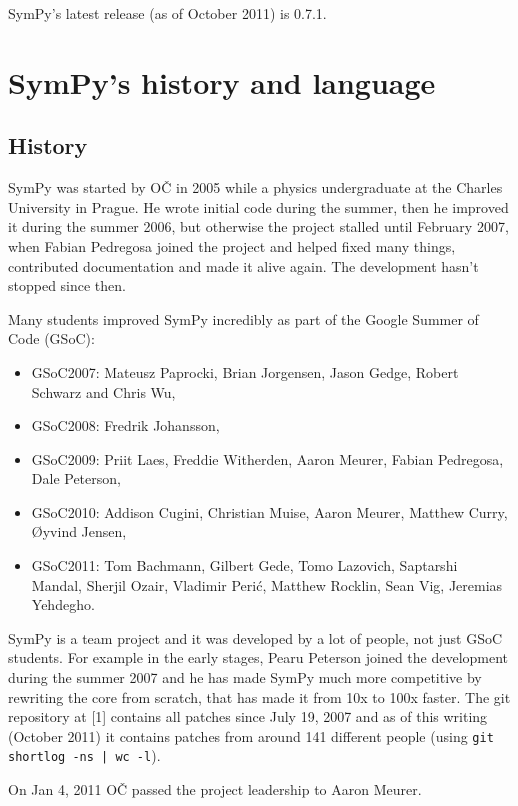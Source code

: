 \documentclass[12pt]{article}
\def\OC{OČ}
\def\AM{Aaron Meurer}
\begin{document}
SymPy's latest release (as of October 2011) is 0.7.1.

\section{SymPy's history and language}

\subsection{History}

SymPy was started by \OC{} in 2005 while a
physics undergraduate at the Charles University in Prague.
He wrote initial code during the
summer, then he improved it during the summer 2006, but otherwise the project
stalled until February 2007, when
Fabian Pedregosa joined the project and helped fixed many things, contributed
documentation and made it alive again. The development hasn't stopped since
then.

Many students improved SymPy incredibly
as part of the Google Summer of Code (GSoC):
\begin{itemize}
\item
GSoC2007: Mateusz Paprocki, Brian
Jorgensen, Jason Gedge, Robert Schwarz and Chris Wu,
\item
GSoC2008: Fredrik Johansson,

\item
GSoC2009: Priit Laes, Freddie Witherden, \AM,
Fabian Pedregosa, Dale Peterson,

\item
GSoC2010:
Addison Cugini, Christian Muise, \AM, Matthew Curry,
{\O}yvind Jensen,

\item
GSoC2011: Tom Bachmann, Gilbert Gede, Tomo Lazovich, Saptarshi Mandal,
Sherjil Ozair, Vladimir Peri\'c,  Matthew Rocklin, Sean Vig, Jeremias Yehdegho.
\end{itemize}

\noindent
SymPy is a team project and it was developed by a lot of people, not
just GSoC students. For example in the early stages, Pearu Peterson
joined the development during the summer 2007 and he has made SymPy much more
competitive by rewriting the core from scratch, that has made it from 10x to
100x faster. The git repository at [1] contains all patches since July 19, 2007
and as of this writing (October 2011) it contains patches from around 141
different people (using {\tt git shortlog -ns | wc -l}).

On Jan 4, 2011 \OC{} passed the project leadership to \AM.
\end{document}
